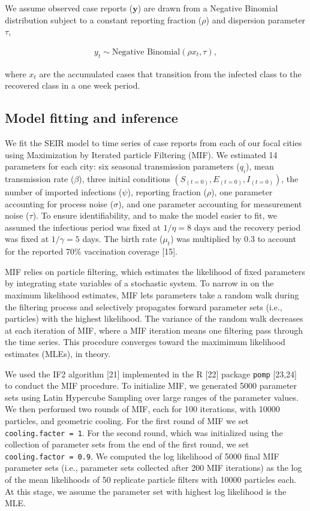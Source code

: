 \documentclass[3p]{elsarticle} %
\begin{document}
We assume observed case reports (\(\textbf{y}\)) are drawn from a
Negative Binomial distribution subject to a constant reporting fraction
(\(\rho\)) and dispersion parameter \(\tau\),

\begin{align}
y_t \sim \text{Negative Binomial} \left( \rho x_t, \tau \right),
\end{align}

\noindent{}where \(x_t\) are the accumulated cases that transition from
the infected class to the recovered class in a one week period.

\hypertarget{model-fitting-and-inference}{%
\subsection{Model fitting and
inference}\label{model-fitting-and-inference}}

We fit the SEIR model to time series of case reports from each of our
focal cities using Maximization by Iterated particle Filtering (MIF). We
estimated 14 parameters for each city: six seasonal transmission
parameters (\(q_i\)), mean transmission rate (\(\beta\)), three initial
conditions \(\left(S_{(t=0)},E_{(t=0)},I_{(t=0)}\right)\), the number of
imported infections (\(\psi\)), reporting fraction (\(\rho\)), one
parameter accounting for process noise (\(\sigma\)), and one parameter
accounting for measurement noise (\(\tau\)). To ensure identifiability,
and to make the model easier to fit, we assumed the infectious period
was fixed at \(1/\eta = 8\) days and the recovery period was fixed at
\(1/\gamma = 5\) days. The birth rate (\(\mu_t\)) was multiplied by 0.3
to account for the reported 70\% vaccination coverage {[}15{]}.

MIF relies on particle filtering, which estimates the likelihood of
fixed parameters by integrating state variables of a stochastic system.
To narrow in on the maximum likelihood estimates, MIF lets parameters
take a random walk during the filtering process and selectively
propagates forward parameter sets (i.e., particles) with the highest
likelihood. The variance of the random walk decreases at each iteration
of MIF, where a MIF iteration means one filtering pass through the time
series. This procedure converges toward the maximimum likelihood
estimates (MLEs), in theory.

We used the IF2 algorithm {[}21{]} implemented in the R {[}22{]} package
\texttt{pomp} {[}23,24{]} to conduct the MIF procedure. To initialize
MIF, we generated 5000 parameter sets using Latin Hypercube Sampling
over large ranges of the parameter values. We then performed two rounds
of MIF, each for 100 iterations, with 10000 particles, and geometric
cooling. For the first round of MIF we set
\texttt{cooling.facter\ =\ 1}. For the second round, which was
initialized using the collection of parameter sets from the end of the
first round, we set \texttt{cooling.factor\ =\ 0.9}. We computed the log
likelihood of 5000 final MIF parameter sets (i.e., parameter sets
collected after 200 MIF iterations) as the log of the mean likelihoods
of 50 replicate particle filters with 10000 particles each. At this
stage, we assume the parameter set with highest log likelihood is the
MLE.
\end{document}
